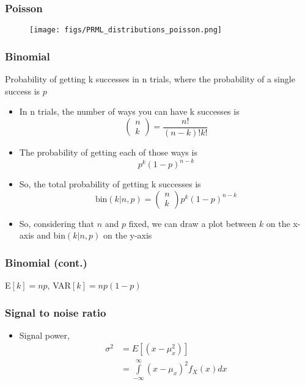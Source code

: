 \begin{frame}
\frametitle{Poisson}
\logoEvolution\mypagenum
	\begin{figure}				
		\texttt{[image: figs/PRML\_distributions\_poisson.png]}
	\end{figure}
\end{frame}



\begin{frame}
\frametitle{Binomial}
\logoEvolution\mypagenum
	Probability of getting k successes in n trials, where the probability of a single success is $p$
	\begin{itemize}
		\item In n trials, the number of {\color{red}ways} you can have k successes is
			\begin{equation*}
				\left(
				\begin{array}{c}
					 n \\ k	
				\end{array}
				\right)
				=
				\frac{n!}{(n-k)!k!}			
			\end{equation*}
		\item The probability of getting each of those {\color{red}ways} is
			\begin{equation*}
				p^k(1-p)^{n-k}
			\end{equation*}
		\item So, the total probability of getting k successes is 
			\begin{equation*}
				\text{bin}(k|n,p) =
				\left(
					\begin{array}{c}
						 n \\ k	
					\end{array}
				\right)
				p^k(1-p)^{n-k}
			\end{equation*}
		\item So, considering that $n$ and $p$ fixed, we can draw a plot between $k$ on the x-axis and bin$(k|n,p)$ on the y-axis
	\end{itemize}
\end{frame}



\begin{frame}
\frametitle{Binomial (cont.)}
\logoEvolution\mypagenum
	E$[k] = np$, VAR$[k]=np(1-p)$
\end{frame}



\begin{frame}
\frametitle{Signal to noise ratio}
\logoEvolution\mypagenum
	\begin{itemize}
		\item Signal power,
			\begin{align*}
				\sigma^2 	&= E\left[(x-\mu_x^2) \right] \\
							&= \int\limits_{-\infty}^{\infty} (x-\mu_x)^2 f_X(x)dx
			\end{align*}
	\end{itemize}
\end{frame}


